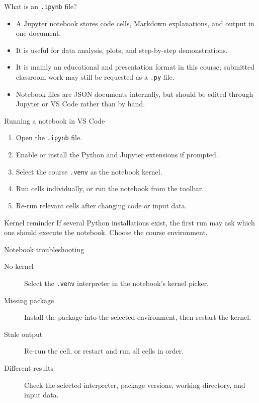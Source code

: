 \documentclass[aspectratio=169,11pt]{beamer}
\begin{document}
\begin{frame}{What is an \texttt{.ipynb} file?}
  \begin{itemize}
    \item A Jupyter notebook stores code cells, Markdown explanations, and
          output in one document.
    \item It is useful for data analysis, plots, and step-by-step demonstrations.
    \item It is mainly an educational and presentation format in this course;
          submitted classroom work may still be requested as a \texttt{.py} file.
    \item Notebook files are JSON documents internally, but should be edited
          through Jupyter or VS Code rather than by hand.
  \end{itemize}
\end{frame}

\begin{frame}{Running a notebook in VS Code}
  \begin{enumerate}
    \item Open the \texttt{.ipynb} file.
    \item Enable or install the Python and Jupyter extensions if prompted.
    \item Select the course \texttt{.venv} as the notebook kernel.
    \item Run cells individually, or run the notebook from the toolbar.
    \item Re-run relevant cells after changing code or input data.
  \end{enumerate}
  \begin{block}{Kernel reminder}
    If several Python installations exist, the first run may ask which one
    should execute the notebook. Choose the course environment.
  \end{block}
\end{frame}

\begin{frame}{Notebook troubleshooting}
  \begin{description}
    \item[No kernel] Select the \texttt{.venv} interpreter in the notebook's
          kernel picker.
    \item[Missing package] Install the package into the selected environment,
          then restart the kernel.
    \item[Stale output] Re-run the cell, or restart and run all cells in order.
    \item[Different results] Check the selected interpreter, package versions,
          working directory, and input data.
  \end{description}
\end{frame}
\end{document}

